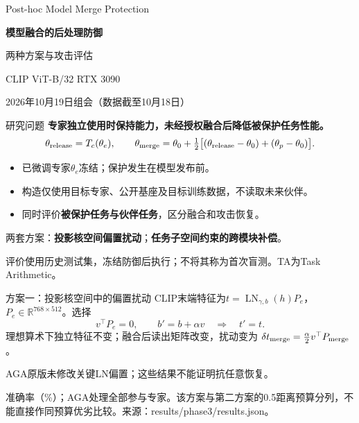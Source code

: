 \documentclass[aspectratio=169,11pt]{beamer}
\newcommand{\source}[1]{{\vfill\scriptsize\color{muted}#1\par}}
\newcommand{\key}[1]{{\color{accent}\bfseries#1}}
\begin{document}
\begin{frame}[plain]
\vspace{12mm}
{\color{accent}\small Post-hoc Model Merge Protection\par}
\vspace{5mm}
{\LARGE\bfseries 模型融合的后处理防御\par}
\vspace{4mm}
{\large 两种方案与攻击评估\par}
\vspace{13mm}
{\color{muted} CLIP ViT-B/32 \quad RTX 3090\par}
{\color{muted}\small 2026年10月19日组会（数据截至10月18日）\par}
\end{frame}

\begin{frame}{研究问题}
\key{专家独立使用时保持能力，未经授权融合后降低被保护任务性能。}
\[
\theta_{\rm release}=T_c(\theta_e),\qquad
\theta_{\rm merge}=\theta_0+\tfrac12
\big[(\theta_{\rm release}-\theta_0)+(\theta_p-\theta_0)\big].
\]
\begin{itemize}\setlength{\itemsep}{6pt}
\item 已微调专家$\theta_e$冻结；保护发生在模型发布前。
\item 构造仅使用目标专家、公开基座及目标训练数据，不读取未来伙伴。
\item 同时评价\textbf{被保护任务与伙伴任务}，区分融合和攻击恢复。
\end{itemize}
\vspace{3mm}
两套方案：\textbf{投影核空间偏置扰动}；\textbf{任务子空间约束的跨模块补偿}。
\source{评价使用历史测试集，冻结防御后执行；不将其称为首次盲测。TA为Task Arithmetic。}
\end{frame}

\begin{frame}{方案一：投影核空间中的偏置扰动}
CLIP末端特征为$t=\operatorname{LN}_{\gamma,b}(h)P_e$，
$P_e\in\mathbb R^{768\times512}$。选择
\[
v^\top P_e=0,\qquad b'=b+\alpha v
\quad\Longrightarrow\quad t'=t.
\]
理想算术下独立特征不变；融合后读出矩阵改变，扰动变为
$\delta t_{\rm merge}=\frac{\alpha}{2}v^\top P_{\rm merge}$。
\vspace{2mm}
\begin{center}\small
\PhaseOneTable
\end{center}
\small
AGA原版未修改关键LN偏置；这些结果不能证明抗任意恢复。
\source{准确率（\%）；AGA处理全部参与专家。该方案与第二方案的0.5距离预算分列，不能直接作同预算优劣比较。来源：results/phase3/results.json。}
\end{frame}
\end{document}
